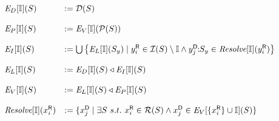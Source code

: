 \begin{figure}[t]
\renewcommand{\S}{\mathcal{S}}
\renewcommand{\Env}[4]{\mbox{\it{E}}_{#1}[#2](#4)}
$$
\begin{array}{ll}
 \Env{D}{\seeni}{\seens}{S} &:= 
      \D{S} \\
 \\
 \Env{P}{\seeni}{\seens}{S} & := 
      \Env{V}{\seeni}{\{S\}\cup\seens}{\P{S}} \\
 \\
 \Env{I}{\seeni}{\seens}{S} & := 
      \bigcup \left\{ \Env{L}{\seeni}{\{S\}\cup\seens}{S_y} \mid \ri{y}{i} \in \I{S} \setminus 
\seeni \wedge \dsi{y}{j}{S_y} \in \Res{\seeni}{\ri{y}{i}}\right\}\\
 \\
 \Env{L}{\seeni}{\seens}{S} & := \Env{D}{\seeni}{\seens}{S} \triangleleft \Env{I}{\seeni}{\seens}{S} \\
 \\
  \Env{V}{\seeni}{\seens}{S}  & := \Env{L}{\seeni}{\seens}{S} \triangleleft \Env{P}{\seeni}{\seens}{S} \\
  \\
  \Res{\seeni}{\ri{x}{i}} & := \{ \di{x}{j} \mid \exists S\ s.t.\ \ri{x}{i} \in \R{S} \wedge \di{x}{j} \in \Env{V}{\{\ri{x}{i}\} \cup \seeni}{\emptyset}{S} \} \\
\end{array}\medskip
$$
\end{figure}
